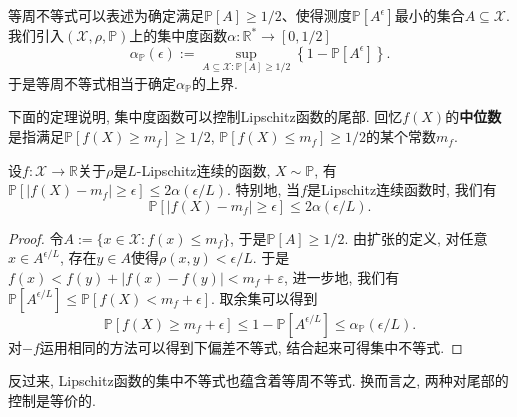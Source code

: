 等周不等式可以表述为确定满足$\mathbb{P}[A] \geq 1/2$、使得测度$\mathbb{P}[A^{\epsilon}]$最小的集合$A \subseteq \mathcal{X}$.
我们引入$(\mathcal{X}, \rho, \mathbb{P})$上的集中度函数$\alpha \colon \mathbb{R}^* \to [0, 1/2]$
\begin{equation*}
	\alpha_{\mathbb{P}}(\epsilon)
	:= \sup_{A \subseteq \mathcal{X} \colon \mathbb{P}[A] \geq 1/2} \left\{ 1 - \mathbb{P}[A^{\epsilon}] \right\}. 
\end{equation*}
于是等周不等式相当于确定$\alpha_{\mathbb{P}}$的上界. 

下面的定理说明, 集中度函数可以控制Lipschitz函数的尾部. 
回忆$f(X)$的\textbf{中位数}是指满足$\mathbb{P}[f(X) \geq m_f] \geq 1/2$, $\mathbb{P}[f(X) \leq m_f] \geq 1/2$的某个常数$m_f$. 

\begin{theorem}[Lévy不等式]
	设$f \colon \mathcal{X} \to \mathbb{R}$关于$\rho$是$L$-Lipschitz连续的函数, $X \sim \mathbb{P}$, 有$\mathbb{P}[ |f(X) - m_f| \geq \epsilon] \leq 2 \alpha(\epsilon / L)$. 
	特别地, 当$f$是Lipschitz连续函数时, 我们有
	\begin{equation*}
		\mathbb{P}[ |f(X) - m_f| \geq \epsilon] \leq 2 \alpha(\epsilon / L). 
	\end{equation*}
\end{theorem}
\begin{proof}
	令$A := \{x \in \mathcal{X} \colon f(x) \leq m_f\}$, 于是$\mathbb{P}[A] \geq 1/2$. 
	由扩张的定义, 对任意$x \in A^{\epsilon / L}$, 存在$y \in A$使得$\rho(x,y) < \epsilon / L$. 
	于是$f(x) < f(y) + |f(x) - f(y)| < m_f + \varepsilon$, 进一步地, 我们有$\mathbb{P}[A^{\epsilon / L}] \leq \mathbb{P}[f(X) < m_f + \epsilon]$. 
	取余集可以得到
	\begin{equation*}
		\mathbb{P}[f(X) \geq m_f + \epsilon] 
		\leq 1 - \mathbb{P}[A^{\epsilon / L}] 
		\leq \alpha_{\mathbb{P}}(\epsilon / L). 
	\end{equation*}
	对$-f$运用相同的方法可以得到下偏差不等式, 结合起来可得集中不等式. 
\end{proof}

反过来, Lipschitz函数的集中不等式也蕴含着等周不等式. 
换而言之, 两种对尾部的控制是等价的. 

